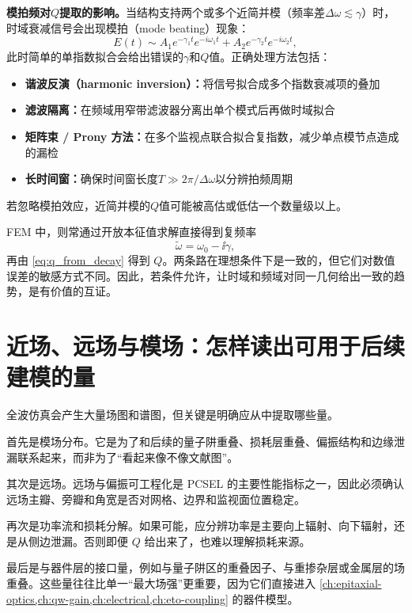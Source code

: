 \begin{warningbox}
\textbf{模拍频对$Q$提取的影响。}当结构支持两个或多个近简并模（频率差$\Delta\omega \lesssim \gamma$）时，时域衰减信号会出现模拍（mode beating）现象：
\[
E(t) \sim A_1 e^{-\gamma_1 t}e^{-i\omega_1 t} + A_2 e^{-\gamma_2 t}e^{-i\omega_2 t},
\]
此时简单的单指数拟合会给出错误的$\gamma$和$Q$值。正确处理方法包括：
\begin{itemize}
  \item \textbf{谐波反演（harmonic inversion）：}将信号拟合成多个指数衰减项的叠加
  \item \textbf{滤波隔离：}在频域用窄带滤波器分离出单个模式后再做时域拟合
  \item \textbf{矩阵束 / Prony 方法：}在多个监视点联合拟合复指数，减少单点模节点造成的漏检
  \item \textbf{长时间窗：}确保时间窗长度$T \gg 2\pi/\Delta\omega$以分辨拍频周期
\end{itemize}
若忽略模拍效应，近简并模的$Q$值可能被高估或低估一个数量级以上。
\end{warningbox}

FEM 中，则常通过开放本征值求解直接得到复频率
\begin{equation}
\tilde\omega=\omega_0-\ii\gamma,
\label{eq:complex_eig_fullwave}
\end{equation}
再由 \cref{eq:q_from_decay} 得到 $Q$。两条路在理想条件下是一致的，但它们对数值误差的敏感方式不同。因此，若条件允许，让时域和频域对同一几何给出一致的趋势，是有价值的互证。

\section{近场、远场与模场：怎样读出可用于后续建模的量}
全波仿真会产生大量场图和谱图，但关键是明确应从中提取哪些量。

首先是模场分布。它是为了和后续的量子阱重叠、损耗层重叠、偏振结构和边缘泄漏联系起来，而非为了“看起来像不像文献图”。

其次是远场。远场与偏振可工程化是 PCSEL 的主要性能指标之一，因此必须确认远场主瓣、旁瓣和角宽是否对网格、边界和监视面位置稳定。

再次是功率流和损耗分解。如果可能，应分辨功率是主要向上辐射、向下辐射，还是从侧边泄漏。否则即便 $Q$ 给出来了，也难以理解损耗来源。

最后是与器件层的接口量，例如与量子阱区的重叠因子、与重掺杂层或金属层的场重叠。这些量往往比单一“最大场强”更重要，因为它们直接进入 \cref{ch:epitaxial-optics,ch:qw-gain,ch:electrical,ch:eto-coupling} 的器件模型。

